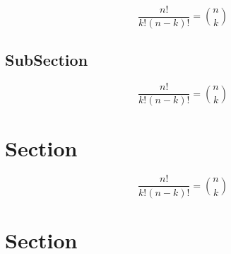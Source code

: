 \documentclass[a4paper]{article}
\begin{document}
\[ \frac{n!}{k!(n-k)!} = \binom{n}{k} \]

\subsection{SubSection}

\[ \frac{n!}{k!(n-k)!} = \binom{n}{k} \]

\section{Section}

\[ \frac{n!}{k!(n-k)!} = \binom{n}{k} \]

\section{Section}
\end{document}
